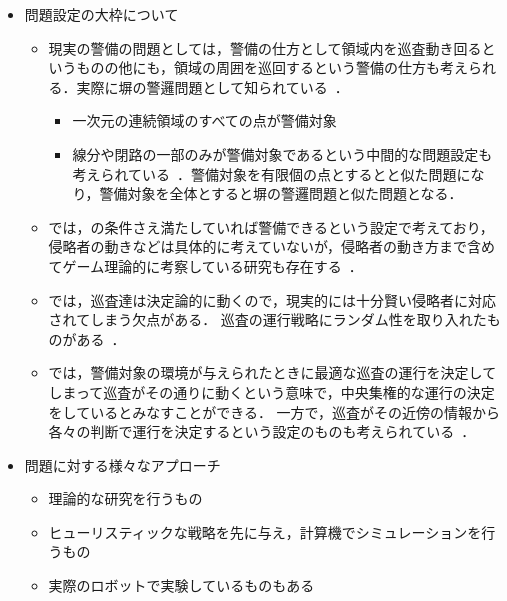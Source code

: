\begin{itemize}
  \item 問題設定の大枠について
  \begin{itemize}
    \item 現実の警備の問題としては，警備の仕方として領域内を巡査動き回るというものの他にも，領域の周囲を巡回するという警備の仕方も考えられる．実際に塀の警邏問題として知られている~\cite{czyzowicz2011boundary, dumitrescu2014fence, kawamura2015fence}．
    \begin{itemize}
      \item 一次元の連続領域のすべての点が警備対象
      \item 線分や閉路の一部のみが警備対象であるという中間的な問題設定も考えられている~\cite{collins2013optimal}．警備対象を有限個の点とすると{\patProb}と似た問題になり，警備対象を全体とすると塀の警邏問題と似た問題となる．
    \end{itemize}
    \item {\patProb}では，{\maxIdletime}の条件さえ満たしていれば警備できるという設定で考えており，侵略者の動きなどは具体的に考えていないが，侵略者の動き方まで含めてゲーム理論的に考察している研究も存在する~\cite{brazdil2015strategy, papadaki2016patrolling}．
    \item {\patProb}では，巡査達は決定論的に動くので，現実的には十分賢い侵略者に対応されてしまう欠点がある．
    巡査の運行戦略にランダム性を取り入れたものがある~\cite{}．
    \item {\patProb}では，警備対象の環境が与えられたときに最適な巡査の運行を決定してしまって巡査がその通りに動くという意味で，中央集権的な運行の決定をしているとみなすことができる．
    一方で，巡査がその近傍の情報から各々の判断で運行を決定するという設定のものも考えられている~\cite{}．
  \end{itemize}

  \item 問題に対する様々なアプローチ
  \begin{itemize}
    \item 理論的な研究を行うもの
    \item ヒューリスティックな戦略を先に与え，計算機でシミュレーションを行うもの
    \item 実際のロボットで実験しているものもある
  \end{itemize}


\end{itemize}
